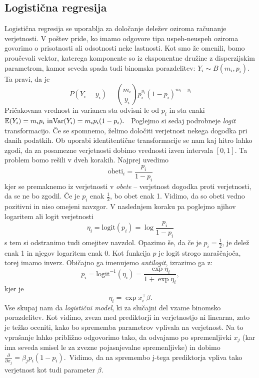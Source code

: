 \documentclass[12pt,a4paper]{amsart}
\theoremstyle{definition} %
\theoremstyle{plain} %
\begin{document}
\subsection{Logistična regresija}
Logistična regresija se uporablja za določanje deležev oziroma računanje verjetnosti. V poštev pride, ko imamo odgovore tipa uspeh-neuspeh oziroma
govorimo o prisotnosti ali odsotnosti neke lastnosti. Kot smo že omenili, bomo proučevali vektor, katerega komponente so iz eksponentne družine z disperzijskim parametrom,
kamor seveda spada tudi binomska porazdelitev: $Y_{i} \sim B(m_{i}, p_{i})$. Ta pravi, da je 
\[
    P(Y_{i} = y_{i}) = {m_{i} \choose y_{i}} p_{i}^{y_{i}}(1 - p_{i}) ^{m_{i} - y_{i}}
\]
Pričakovana vrednost in varianca sta odvisni le od $p_{i}$ in sta enaki $\mathbb{E}(Y_{i}) = m_{i}p_{i} \text{~in}\\\mathrm{Var}(Y_{i}) = m_{i}p_{i}(1 - p_{i}).$~
Poglejmo si sedaj podrobneje \textit{logit} transformacijo. Če se spomnemo, želimo določiti verjetnost nekega dogodka pri danih podatkih. Ob uporabi
identitentične transformacije se nam kaj hitro lahko zgodi, da za posamezne verjetnosti dobimo vrednosti izven intervala $[0,1]$. Ta problem bomo rešili v 
dveh korakih.
Najprej uvedimo 
\[ 
    \mathrm{obeti}_{i} = \frac{p_{i}}{1 - p_{i}} %
\]
kjer se premaknemo iz verjetnosti v \textit{obete} -- verjetnost dogodka proti verjetnosti, da se ne bo zgodil. Če je $p_{i}$ enak $\frac{1}{2}$, 
bo obet enak 1. Vidimo, da so obeti vedno pozitivni in niso omejeni navzgor.
V naslednjem koraku pa poglejmo njihov logaritem ali logit verjetnosti
\[
    \eta_{i} = \mathrm{logit}(p_{i}) = \log \frac{p_{i}}{1 - p_{i}}
\]
s tem si odstranimo tudi omejitev navzdol. Opazimo še, da če je $p_{i} = \frac{1}{2}$, je delež enak 1 in njegov logaritem enak 0. Kot funkcija $p$ je logit
strogo naraščajoča, torej imamo inverz. Običajno ga imenujemo \textit{antilogit}, izrazimo ga z:
\begin{equation}\label{p_i}
    p_{i} = \mathrm{logit}^{-1}(\eta_{i}) = \frac{\exp{\eta_{i}}}{1+\exp{\eta_{i}}},
\end{equation}
kjer je
\[
    \eta_{i} = \exp{x_{i}^\top\beta}.
\]
Vse skupaj nam da \textit{logistični model}, ki za slučajni del vzame binomsko porazdelitev. %
Kot vidimo, zveza med prediktorji in verjetnostjo ni linearna, zato je težko oceniti, kako bo sprememba parametrov
vplivala na verjetnost. Na to vprašanje lahko približno odgovorimo tako, da odvajamo po spremenljivki $x_{j}$ (kar ima seveda smisel le za zvezne
pojasnjevalne spremenljivke) in dobimo $\tfrac{\partial}{\partial x_{j}} = \beta_{j}p_{i}(1 - p_{i}).$~Vidimo, da na spremembo j-tega prediktorja
vpliva tako verjetnost kot tudi parameter $\beta$.
\end{document}
